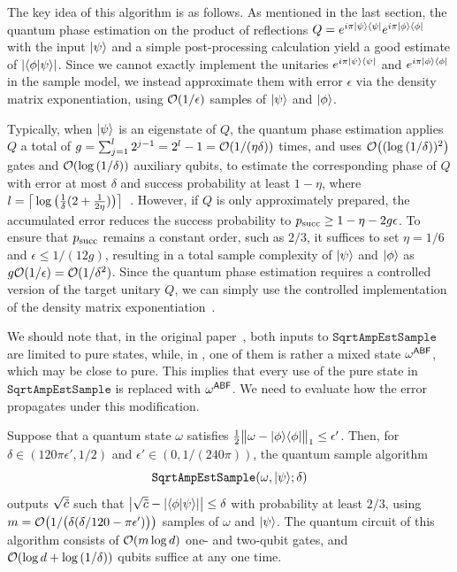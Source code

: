 The key idea of this algorithm is as follows. As mentioned in the last section, the quantum phase estimation on the product of reflections $Q = e^{i\pi|\psi\rangle\langle\psi|}e^{i\pi|\phi\rangle\langle\phi|}$ with the input $|\psi\rangle$ and a simple post-processing calculation yield a good estimate of $|\langle \phi \vert \psi \rangle|$.
Since we cannot exactly implement the unitaries $e^{i\pi|\psi\rangle\langle\psi|}$ and $e^{i\pi|\phi\rangle\langle\phi|}$ in the sample model, we instead approximate them with error $\epsilon$ via the density matrix exponentiation, using ${\mathcal{O}}(1/\epsilon)$ samples of $|\psi\rangle$ and $|\phi\rangle$. 


Typically, when $|\psi\rangle$ is an eigenstate of $Q$, the quantum phase estimation applies $Q$ a total of $g = \sum_{j=1}^l 2^{j-1} = 2^l - 1 = {\mathcal{O}}(1/(\eta\delta))$ times, and uses ${\mathcal{O}}\big((\log{(1/\delta)})^2\big)$ gates and ${\mathcal{O}}(\log{(1/\delta)})$ auxiliary qubits, to estimate the corresponding phase of $Q$ with error at most $\delta$ and success probability at least $1 - \eta$, where $l = \big\lceil\log{\big(\frac{1}{\delta}(2+\frac{1}{2\eta})\big)}\big\rceil$~\cite{kitaev1995quantummeasurementsabelian, cleve1997quantumalgorithmrevisit, nielsen2010quantum}.
However, if $Q$ is only approximately prepared, the accumulated error reduces the success probability to $p_{\rm succ} \geq 1 - \eta - 2g\epsilon$.
To ensure that $p_{\rm succ}$ remains a constant order, such as $2/3$, it suffices to set $\eta = 1/6$ and $\epsilon \leq 1/(12g)$, resulting in a total sample complexity of $|\psi\rangle$ and $|\phi\rangle$ as $g{\mathcal{O}}(1/\epsilon) = {\mathcal{O}}(1/\delta^2)$.
Since the quantum phase estimation requires a controlled version of the target unitary $Q$, we can simply use the controlled implementation of the density matrix exponentiation~\cite{kimmel2017HamSimSampleComp}.


We should note that, in the original paper~\cite{wang2024sampleoptimal}, both inputs to $\mathtt{SqrtAmpEstSample}$ are limited to pure states, while, in , one of them is rather a mixed state $\omega^{{\mathsf{A}}{\mathsf{B}}{\mathsf{F}}}$, which may be close to pure.
This implies that every use of the pure state in $\mathtt{SqrtAmpEstSample}$ is replaced with $\omega^{{\mathsf{A}}{\mathsf{B}}{\mathsf{F}}}$.
We need to evaluate how the error propagates under this modification.

\begin{lemma}
\label{lem:modif square root est sample}
Suppose that a quantum state $\omega$ satisfies $\frac{1}{2}\big\|\omega - |\phi\rangle\langle\phi|\big\|_1 \leq \epsilon'$. Then, for $\delta \in (120\pi\epsilon', 1/2)$ and $\epsilon' \in (0, 1/(240\pi))$, the quantum sample algorithm 
\begin{align}
    \mathtt{SqrtAmpEstSample}(\omega, |\psi\rangle; \delta)
\end{align}
outputs $\sqrt{\tilde{c}}$ such that $\big|\sqrt{\tilde{c}} - |\langle \phi \vert \psi \rangle|\big| \leq \delta$ with probability at least $2/3$, using $m = {\mathcal{O}}\big(1/\big(\delta(\delta/120 - \pi\epsilon')\big)\big)$ samples of $\omega$ and $|\psi\rangle$.
The quantum circuit of this algorithm consists of ${\mathcal{O}}(m\log{d})$ one- and two-qubit gates, and ${\mathcal{O}}(\log{d} + \log{(1/\delta)})$ qubits suffice at any one time.
\end{lemma}


